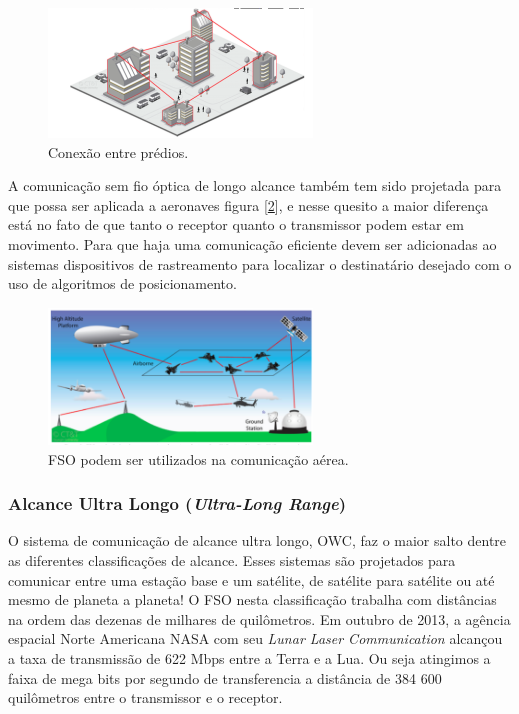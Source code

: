 \begin{figure}
	\centering
		\includegraphics[width = 7cm]{figuras/longo1}
	\caption{Conexão entre prédios.}
	\label{Fig: longo1}
\end{figure}

A comunicação sem fio óptica de longo alcance também tem sido projetada para que possa ser aplicada a aeronaves figura [\ref{Fig: longo2}], e nesse quesito a maior diferença está no fato de que tanto o receptor quanto o transmissor podem estar em movimento. Para que haja uma comunicação eficiente devem ser adicionadas ao sistemas dispositivos de rastreamento para localizar o destinatário desejado com o uso de algoritmos de posicionamento. \cite{Haan}

\begin{figure}
	\centering
		\includegraphics[width = 7cm]{figuras/longo2}
	\caption{FSO podem ser utilizados na comunicação aérea.}
	\label{Fig: longo2}
\end{figure}


\subsubsection{Alcance Ultra Longo (\textit{Ultra-Long Range})}

O sistema de comunicação de alcance ultra longo, OWC, faz o maior salto dentre as diferentes classificações de alcance. Esses sistemas são projetados para comunicar entre uma estação base e um satélite, de satélite para satélite ou até mesmo de planeta a planeta! O FSO nesta classificação trabalha com distâncias na ordem das dezenas de milhares de quilômetros. Em outubro de 2013, a agência espacial Norte Americana NASA com seu \textit{Lunar Laser Communication} alcançou a taxa de transmissão de 622 Mbps entre a Terra e a Lua. Ou seja atingimos a faixa de mega bits por segundo de transferencia a distância de 384 600 quilômetros entre o transmissor e o receptor.\cite{NASA}



